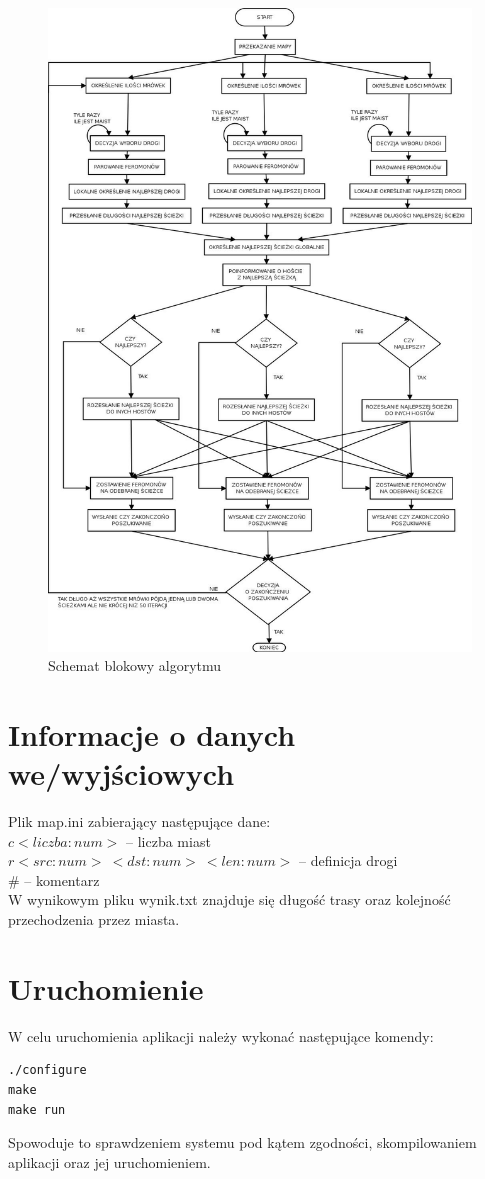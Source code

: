 \documentclass[12pt,a4paper]{article}
\begin{document}
\begin{figure}
\vspace{-4.5cm}
\caption{Schemat blokowy algorytmu}
\label{fig:schemat}
\hspace{-2cm}
\includegraphics[scale=0.5]{schemat.png}
\end{figure}
\section{Informacje o danych we/wyjściowych}
Plik map.ini zabierający następujące dane:\\
$c <liczba:num>$ -- liczba miast\\
$r <src:num>\ <dst:num>\ <len:num>$ -- definicja drogi\\
$\#$ -- komentarz\\
W wynikowym pliku wynik.txt znajduje się długość trasy oraz kolejność przechodzenia przez miasta. 
\section{Uruchomienie}
W celu uruchomienia aplikacji należy wykonać następujące komendy:
\begin{verbatim}
./configure
make
make run
\end{verbatim}
Spowoduje to sprawdzeniem systemu pod kątem zgodności, skompilowaniem aplikacji oraz jej uruchomieniem.
\end{document}
